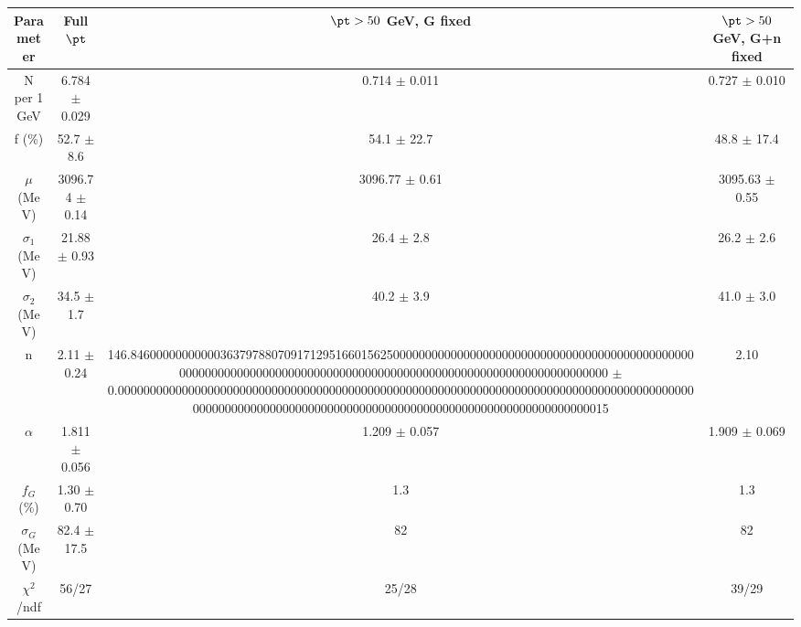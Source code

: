 \begin{tabular}{c||c|c|c}
Parameter & Full $\pt$ & $\pt>50$ GeV, G fixed & $\pt>50$ GeV, G+n fixed \\
\hline
N per 1 GeV & 6.784 $\pm$ 0.029 & 0.714 $\pm$ 0.011 & 0.727 $\pm$ 0.010\\
f (\%) & 52.7 $\pm$ 8.6 & 54.1 $\pm$ 22.7 & 48.8 $\pm$ 17.4\\
$\mu$ (MeV) & 3096.74 $\pm$ 0.14 & 3096.77 $\pm$ 0.61 & 3095.63 $\pm$ 0.55\\
$\sigma_1$ (MeV) & 21.88 $\pm$ 0.93 & 26.4 $\pm$ 2.8 & 26.2 $\pm$ 2.6\\
$\sigma_2$ (MeV) & 34.5 $\pm$ 1.7 & 40.2 $\pm$ 3.9 & 41.0 $\pm$ 3.0\\
n & 2.11 $\pm$ 0.24 & 146.84600000000000363797880709171295166015625000000000000000000000000000000000000000000000000000000000000000000000000000000000000000000000000000000000000000000 $\pm$ 0.00000000000000000000000000000000000000000000000000000000000000000000000000000000000000000000000000000000000000000000000000000000000000000000000000000000015 & 2.10\\
$\alpha$ & 1.811 $\pm$ 0.056 & 1.209 $\pm$ 0.057 & 1.909 $\pm$ 0.069\\
$f_G$ (\%) & 1.30 $\pm$ 0.70 & 1.3 & 1.3\\
$\sigma_G$ (MeV) & 82.4 $\pm$ 17.5 & 82 & 82\\
\hline
$\chi^2$/ndf & 56/27 & 25/28 & 39/29\\
\end{tabular}
